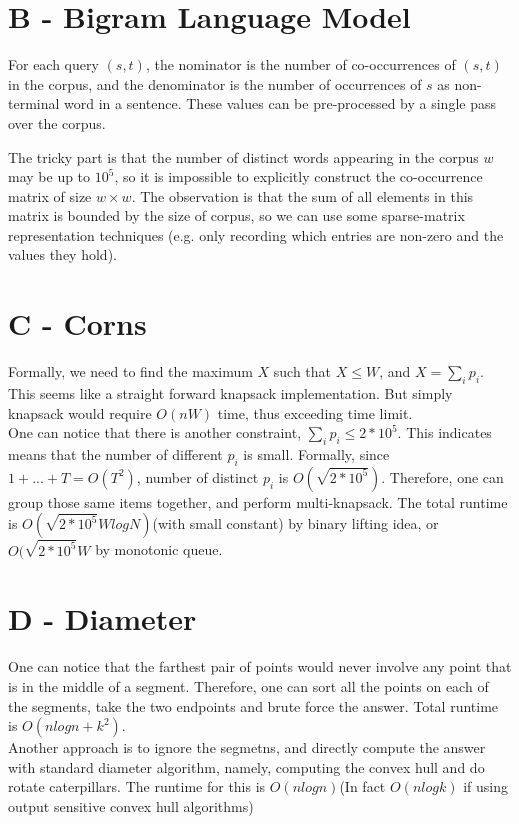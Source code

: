 \documentclass{article}
\begin{document}
\section*{B - Bigram Language Model}

For each query $(s,t)$, the nominator is the number of co-occurrences of $(s,t)$ in the corpus, and the denominator is the number of occurrences of $s$ as non-terminal word in a sentence. These values can be pre-processed by a single pass over the corpus.

The tricky part is that the number of distinct words appearing in the corpus $w$ may be up to $10^5$, so it is impossible to explicitly construct the co-occurrence matrix of size $w \times w$. The observation is that the sum of all elements in this matrix is bounded by the size of corpus, so we can use some sparse-matrix representation techniques (e.g. only recording which entries are non-zero and the values they hold).

\section*{C - Corns}
Formally, we need to find the maximum $X$ such that $X \leq W$, and $X = \sum_i p_i$. This seems like a straight forward knapsack implementation. But simply knapsack would require $O(nW)$ time, thus exceeding time limit. \\
One can notice that there is another constraint, $\sum_i p_i \leq 2 * 10^5$. This indicates means that the number of different $p_i$ is small. Formally, since $1 + ... + T = O(T^2)$, number of distinct $p_i$ is $O(\sqrt{2 * 10^5})$. Therefore, one can group those same items together, and perform multi-knapsack. The total runtime is $O(\sqrt{2 * 10^5} W logN)$(with small constant) by binary lifting idea, or $O(\sqrt{2 * 10^5} W$ by monotonic queue.


\section*{D - Diameter}
One can notice that the farthest pair of points would never involve any point that is in the middle of a segment. Therefore, one can sort all the points on each of the segments, take the two endpoints and brute force the answer. Total runtime is $O(n logn + k^2)$. \\
Another approach is to ignore the segmetns, and directly compute the answer with standard diameter algorithm, namely, computing the convex hull and do rotate caterpillars. The runtime for this is $O(n logn)$(In fact $O(nlog k)$ if using output sensitive convex hull algorithms) \\
\end{document}
